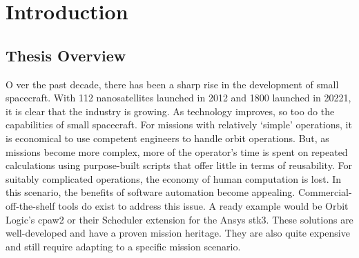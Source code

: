 \glsresetall{} 
\chapter{Introduction}


\section{Thesis Overview}


\lettrine[lines=2, findent=0pt, nindent=5pt]{O}{} ver the past decade, there
has been a sharp rise in the development of small spacecraft. With 112
nanosatellites launched in 2012 and 1800 launched in 20221, it is clear that
the industry is growing. As technology improves, so too do the capabilities of
small spacecraft. For missions with relatively ‘simple’ operations, it is
economical to use competent engineers to handle orbit operations. But, as
missions become more complex, more of the operator’s time is spent on repeated
calculations using purpose-built scripts that offer little in terms of
reusability. For suitably complicated operations, the economy of human
computation is lost. In this scenario, the benefits of software automation
become appealing. Commercial-off-the-shelf tools do exist to address this
issue. A ready example would be Orbit Logic’s \gls{cpaw}2 or their Scheduler
extension for the Ansys \gls{stk}3. These solutions are well-developed and have
a proven mission heritage. They are also quite expensive and still require
adapting to a specific mission scenario.  \\ 



